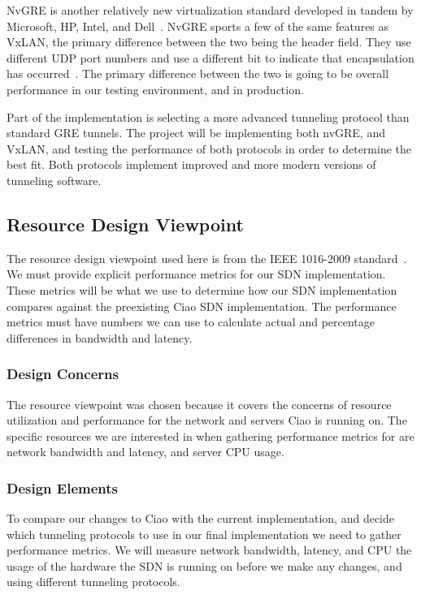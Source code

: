 \documentclass[10pt,onecolumn,journal,draftclsnofoot]{IEEEtran}
\begin{document}
NvGRE is another relatively new virtualization standard developed in tandem by
Microsoft, HP, Intel, and Dell~\cite{nvgre-info}. NvGRE sports a few of the
same features as VxLAN, the primary difference between the two being the header
field. They use different UDP port numbers and use a different bit to indicate
that encapsulation has occurred~\cite{nvgre}. The primary difference between the
two is going to be overall performance in our testing environment, and in
production.

Part of the implementation is selecting a more advanced tunneling protocol than
standard GRE tunnels. The project will be implementing both nvGRE, and VxLAN,
and testing the performance of both protocols in order to determine the best
fit. Both protocols implement improved and more modern versions of tunneling
software. 

\subsection{Resource Design Viewpoint}
The resource design viewpoint used here is from the IEEE 1016-2009 
standard~\cite{ieee1016}.
We must provide explicit performance metrics for our SDN implementation.
These metrics will be what we use to determine how our SDN implementation
compares against the preexisting Ciao SDN implementation. 
The performance metrics must have numbers we can use to calculate actual and 
percentage differences in bandwidth and latency.

\subsubsection{Design Concerns}
The resource viewpoint was chosen because it covers the 
concerns of resource utilization and performance for the network and servers 
Ciao is running on.
The specific resources we are interested in when gathering performance metrics 
for are network bandwidth and latency, and server CPU usage.

\subsubsection{Design Elements}
To compare our changes to Ciao with the current implementation, and decide 
which tunneling protocols to use in our final implementation we need to gather 
performance metrics.
We will measure network bandwidth, latency, 
and CPU the usage of the hardware the SDN is running on before we make any 
changes, and using different tunneling protocols.
\end{document}
